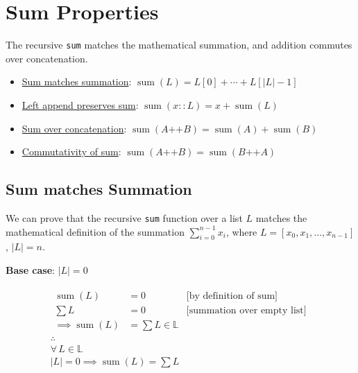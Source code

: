 \section{Sum Properties}
\label{sec:sum}

The recursive \texttt{sum} matches the mathematical summation, and
addition commutes over concatenation.

\begin{itemize}
  \item \href{https://github.com/thiagomata/prime-numbers/blob/list-article-v1.0.0/src/main/scala/v1/chapter3/list/ListUtils.scala}{Sum matches summation}:
    $\operatorname{sum}(L) = L[0] + \cdots + L[|L|-1]$
  \item \href{https://github.com/thiagomata/prime-numbers/blob/list-article-v1.0.0/src/main/scala/v1/chapter3/list/ListUtils.scala}{Left append preserves sum}:
    $\operatorname{sum}(x :: L) = x + \operatorname{sum}(L)$
  \item \href{https://github.com/thiagomata/prime-numbers/blob/list-article-v1.0.0/src/main/scala/v1/chapter3/list/ListUtils.scala}{Sum over concatenation}:
    $\operatorname{sum}(A \mathbin{\texttt{++}} B) = \operatorname{sum}(A) + \operatorname{sum}(B)$
  \item \href{https://github.com/thiagomata/prime-numbers/blob/list-article-v1.0.0/src/main/scala/v1/chapter3/list/ListUtils.scala}{Commutativity of sum}:
    $\operatorname{sum}(A \mathbin{\texttt{++}} B) = \operatorname{sum}(B \mathbin{\texttt{++}} A)$
\end{itemize}

\subsection{Sum matches Summation}

We can prove that the recursive \texttt{sum} function over a list $L$
matches the mathematical definition of the summation
$\sum_{i=0}^{n-1} x_i$, where $L = [x_0, x_1, \dots, x_{n-1}]$, $|L| = n$.

\textbf{Base case}: $|L| = 0$\par\nopagebreak

\begin{gather*}
\begin{aligned}
\operatorname{sum}(L) &= 0 & \text{[by definition of sum]} \\
\sum L &= 0 & \text{[summation over empty list]} \\
\implies \operatorname{sum}(L) &= \sum L \in \mathbb{L}
\end{aligned} \\
\therefore \\
\forall\, L \in \mathbb{L} \\
|L| = 0 \implies \operatorname{sum}(L) = \sum L
\end{gather*}

